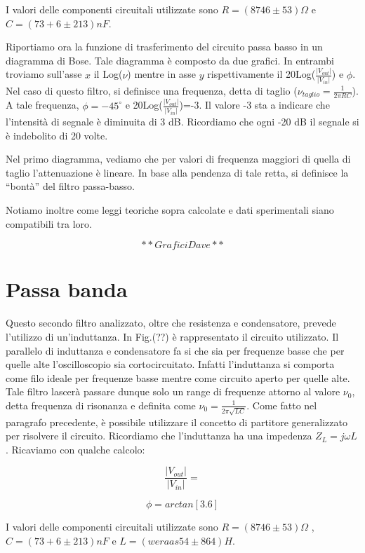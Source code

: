 I valori delle componenti circuitali utilizzate sono $R=(8746 \pm 53) \Omega$ e $C=(73+6 \pm 213) nF$.

Riportiamo ora la funzione di trasferimento del circuito passa basso in un diagramma di Bose. Tale diagramma è composto da due grafici. In entrambi troviamo sull'asse $x$ il Log($\nu$) mentre in asse $y$ rispettivamente il 20Log($\frac{|V_{out}|}{|V_{in}|}$) e $\phi$. Nel caso di questo filtro, si definisce una frequenza, detta di taglio ($\nu_{taglio}=\frac{1}{2 \pi RC}$). A tale frequenza, $\phi=-45 ^{\circ}$ e 20Log($\frac{|V_{out}|}{|V_{in}|}$)=-3. Il valore -3 sta a indicare che l'intensità di segnale è diminuita di 3 dB. Ricordiamo che ogni -20 dB il segnale si è indebolito di 20 volte. 

Nel primo diagramma, vediamo che per valori di frequenza maggiori di quella di taglio l'attenuazione è lineare. In base alla pendenza di tale retta, si definisce la ``bontà'' del filtro passa-basso.

Notiamo inoltre come leggi teoriche sopra calcolate e dati sperimentali siano compatibili tra loro.

$$**Grafici Dave**$$

\section{Passa banda}
Questo secondo filtro analizzato, oltre che resistenza e condensatore, prevede l'utilizzo di un'induttanza. In Fig.(??) è rappresentato il circuito utilizzato. Il parallelo di induttanza e condensatore fa si che sia per frequenze basse che per quelle alte l'oscilloscopio sia cortocircuitato. Infatti l'induttanza si comporta come filo ideale per frequenze basse mentre come circuito aperto per quelle alte. Tale filtro lascerà passare dunque solo un range di frequenze attorno al valore $\nu_0$, detta frequenza di risonanza e definita come $\nu_0=\frac{1}{2 \pi \sqrt{LC}}$. Come fatto nel paragrafo precedente, è possibile utilizzare il concetto di partitore generalizzato per risolvere il circuito. Ricordiamo che l'induttanza ha una impedenza $Z_L=j\omega L$. Ricaviamo con qualche calcolo:

\begin{equation}
\frac{|V_{out}|}{|V_{in}|}=
\end{equation}

\begin{equation}
\phi=arctan[3.6]
\end{equation}

I valori delle componenti circuitali utilizzate sono $R=(8746 \pm 53) \Omega$ , $C=(73+6 \pm 213) nF$ e $L=(weraas54 \pm 864) H$.


